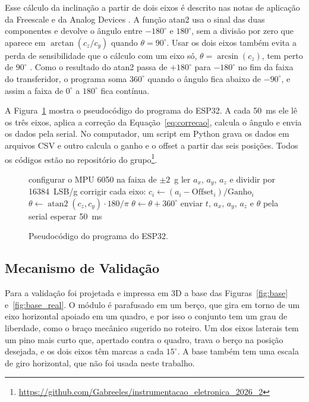 \documentclass[conference]{IEEEtran}
\begin{document}
Esse cálculo da inclinação a partir de dois eixos é descrito nas notas de aplicação da Freescale \cite{pedley2013} e da Analog Devices \cite{fisher2010}. A função atan2 usa o sinal das duas componentes e devolve o ângulo entre $-180^\circ$ e $180^\circ$, sem a divisão por zero que aparece em $\arctan(c_z/c_y)$ quando $\theta = 90^\circ$. Usar os dois eixos também evita a perda de sensibilidade que o cálculo com um eixo só, $\theta = \arcsin(c_z)$, tem perto de $90^\circ$ \cite{fisher2010}. Como o resultado do atan2 passa de $+180^\circ$ para $-180^\circ$ no fim da faixa do transferidor, o programa soma $360^\circ$ quando o ângulo fica abaixo de $-90^\circ$, e assim a faixa de $0^\circ$ a $180^\circ$ fica contínua.

A Figura~\ref{fig:pseudocodigo} mostra o pseudocódigo do programa do ESP32. A cada 50~ms ele lê os três eixos, aplica a correção da Equação~\eqref{eq:correcao}, calcula o ângulo e envia os dados pela serial. No computador, um script em Python grava os dados em arquivos CSV e outro calcula o ganho e o offset a partir das seis posições. Todos os códigos estão no repositório do grupo\footnote{\url{https://github.com/Gabreeles/instrumentacao_eletronica_2026_2}}.

\begin{figure}[!t]
	\begin{algorithmic}[1]
		\STATE configurar o MPU 6050 na faixa de $\pm 2$~g
		\LOOP
		\STATE ler $a_x$, $a_y$, $a_z$ e dividir por 16384~LSB/g
		\STATE corrigir cada eixo: $c_i \leftarrow (a_i - \text{Offset}_i)/\text{Ganho}_i$
		\STATE $\theta \leftarrow \operatorname{atan2}(c_z, c_y) \cdot 180/\pi$
		\STATE $\theta \leftarrow \theta + 360^\circ$
		\ENDIF
		\STATE enviar $t$, $a_x$, $a_y$, $a_z$ e $\theta$ pela serial
		\STATE esperar 50~ms
		\ENDLOOP
	\end{algorithmic}
	\caption{Pseudocódigo do programa do ESP32.}
	\label{fig:pseudocodigo}
\end{figure}

\subsection{Mecanismo de Validação}
Para a validação foi projetada e impressa em 3D a base das Figuras~\ref{fig:base} e~\ref{fig:base_real}. O módulo é parafusado em um berço, que gira em torno de um eixo horizontal apoiado em um quadro, e por isso o conjunto tem um grau de liberdade, como o braço mecânico sugerido no roteiro. Um dos eixos laterais tem um pino mais curto que, apertado contra o quadro, trava o berço na posição desejada, e os dois eixos têm marcas a cada $15^\circ$. A base também tem uma escala de giro horizontal, que não foi usada neste trabalho.
\end{document}
